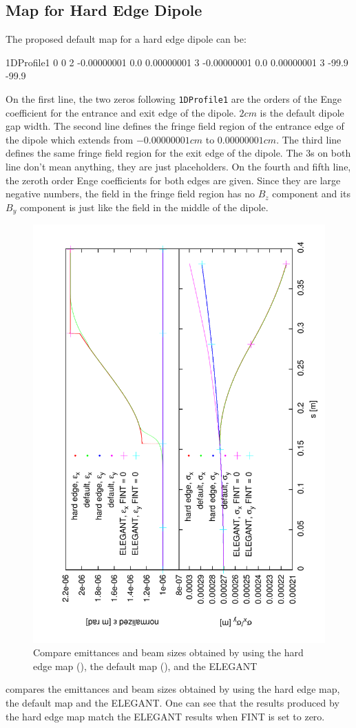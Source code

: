 \subsection{Map for Hard Edge Dipole}
The proposed default map for a hard edge dipole can be:
\begin{description}
\item
\begin{example}
1DProfile1  0  0  2
-0.00000001 0.0 0.00000001 3
-0.00000001 0.0 0.00000001 3
-99.9
-99.9
\end{example}
\end{description}
On the first line, the two zeros following  \texttt{1DProfile1} are the orders of the Enge coefficient for the entrance and exit edge of the dipole. $2 cm$ is the default dipole gap width. The second line defines the fringe field region of the entrance edge of the dipole which extends from $-0.00000001 cm$ to $0.00000001 cm$.  The third line defines the same fringe field region for the exit edge of the dipole. The $3$s on both line don't mean anything, they are just placeholders. On the fourth and fifth line, the zeroth order Enge coefficients for both edges are given. Since they are large negative numbers, the field in the fringe field region has no $B_z$ component and its $B_y$ component is just like the field in the middle of the dipole.
\begin{figure}[!htb]
\centering
\includegraphics[height=0.5\textwidth-0.6cm, angle = -90, trim = 8mm 10mm 2mm 10mm, clip]{figures/Benchmarks/report-compare-default}
\caption{Compare emittances and beam sizes obtained by using the hard edge map (\opal), the default map (\opal), and the ELEGANT}
\label{fig:plot-compare-default}
\end{figure}
 compares the emittances and beam sizes obtained by using the hard edge map, the default map and the ELEGANT. One can see that the results produced by the hard edge map match the ELEGANT results when FINT is set to zero.

